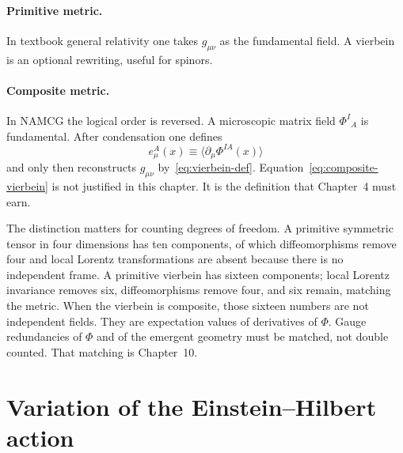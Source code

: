 \paragraph{Primitive metric.}
In textbook general relativity one takes \(g_{\mu\nu}\) as the
fundamental field. A vierbein is an optional rewriting, useful for
spinors.

\paragraph{Composite metric.}
In NAMCG the logical order is reversed. A microscopic matrix field
\(\Phi^I{}_A\) is fundamental. After condensation one defines
\begin{equation}
  \label{eq:composite-vierbein}
  e^A_\mu(x)\equiv\langle\partial_\mu\Phi^{IA}(x)\rangle
\end{equation}
and only then reconstructs \(g_{\mu\nu}\) by~\eqref{eq:vierbein-def}.
Equation~\eqref{eq:composite-vierbein} is not justified in this
chapter. It is the definition that Chapter~4 must earn.

The distinction matters for counting degrees of freedom. A primitive
symmetric tensor in four dimensions has ten components, of which
diffeomorphisms remove four and local Lorentz transformations are
absent because there is no independent frame. A primitive vierbein has
sixteen components; local Lorentz invariance removes six, diffeomorphisms
remove four, and six remain, matching the metric. When the vierbein is
composite, those sixteen numbers are not independent fields. They are
expectation values of derivatives of \(\Phi\). Gauge redundancies of
\(\Phi\) and of the emergent geometry must be matched, not double
counted. That matching is Chapter~10.

\section{Variation of the Einstein--Hilbert action}
\label{sec:ch2-EH}

